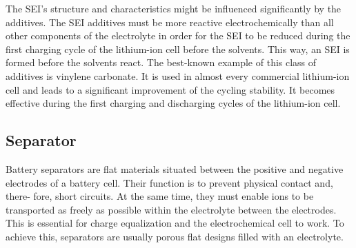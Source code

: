 The SEI's structure and characteristics might be influenced significantly by the additives. The SEI additives must be more reactive electrochemically than all other components of the electrolyte in order for the SEI to be reduced during the first charging cycle of the lithium-ion cell before the solvents. This way, an SEI is formed before the solvents react.
The best-known example of this class of additives is vinylene carbonate. It is used in almost every commercial lithium-ion cell and leads to a significant improvement of the cycling stability. It becomes effective during the first charging and discharging cycles of the lithium-ion cell.

\subsection{Separator}
\label{sec:separator}
Battery separators are flat materials situated between the positive and negative electrodes of a battery cell. Their function is to prevent physical contact and, there- fore, short circuits. At the same time, they must enable ions to be transported as freely as possible within the electrolyte between the electrodes. This is essential for charge equalization and the electrochemical cell to work. To achieve this, separators are usually porous flat designs filled with an electrolyte.

